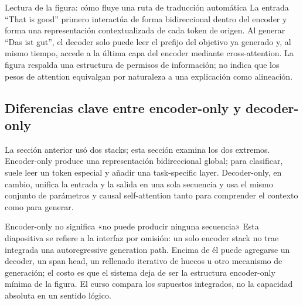 
\begin{knowledgebox}{Lectura de la figura: cómo fluye una ruta de traducción automática}
La entrada ``That is good'' primero interactúa de forma bidireccional dentro del encoder y forma una representación contextualizada de cada token de origen. Al generar ``Das ist gut'', el decoder solo puede leer el prefijo del objetivo ya generado y, al mismo tiempo, accede a la última capa del encoder mediante cross-attention. La figura respalda una estructura de permisos de información; no indica que los pesos de attention equivalgan por naturaleza a una explicación como alineación.
\end{knowledgebox}

\subsection{Diferencias clave entre encoder-only y decoder-only}

La sección anterior usó dos stacks; esta sección examina los dos extremos. Encoder-only produce una representación bidireccional global; para clasificar, suele leer un token especial y añadir una task-specific layer. Decoder-only, en cambio, unifica la entrada y la salida en una sola secuencia y usa el mismo conjunto de parámetros y causal self-attention tanto para comprender el contexto como para generar.


\begin{warningbox}{Encoder-only no significa «no puede producir ninguna secuencia»}
Esta diapositiva se refiere a la interfaz por omisión: un solo encoder stack no trae integrada una autoregressive generation path. Encima de él puede agregarse un decoder, un span head, un rellenado iterativo de huecos u otro mecanismo de generación; el costo es que el sistema deja de ser la estructura encoder-only mínima de la figura. El curso compara los supuestos integrados, no la capacidad absoluta en un sentido lógico.
\end{warningbox}


